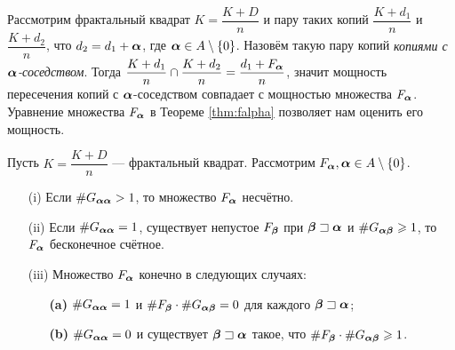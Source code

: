 Рассмотрим фрактальный квадрат $K=\dfrac{K+D}{n}$ и пару таких копий $\dfrac{K+d_1}{n}$ и $\dfrac{K+d_2}{n}$, что $d_2=d_1+{\bm{\alpha}}$, где ${\bm{\alpha}}\in A\setminus\{0\}$.
Назовём такую пару копий {\em копиями с ${\bm{\alpha}}$-соседством}.
Тогда $\dfrac{K+d_1}{n}\cap\dfrac{K+d_2}{n}=\dfrac{d_1+F_{\bm{\alpha}}}{n}$, значит мощность пересечения копий с ${\bm{\alpha}}$-соседством совпадает с мощностью множества $F_{\bm{\alpha}}$.
Уравнение множества $F_{\bm{\alpha}}$ в Теореме \ref{thm:falpha} позволяет нам оценить его мощность.

\begin{theorem}\label{fin_int}
Пусть $K=\dfrac{K+D}{n}$ --- фрактальный квадрат. Рассмотрим $F_{\bm{\alpha}}, {\bm{\alpha}}\in A\setminus\{0\}$.
\begin{itemize}[nolistsep]
 \item[(i)] Если $\#G_{{\bm{\alpha}}{\bm{\alpha}}}> 1$, то множество $F_{\bm{\alpha}}$ несчётно.
 \item[(ii)] Если $\#G_{{\bm{\alpha}}{\bm{\alpha}}}=1$, существует непустое $F_{\bm{\beta}}$ при ${\bm{\beta}}\sqsupset{\bm{\alpha}}$ и $\#G_{{\bm{\alpha}}{\bm{\beta}}}\geqslant1$, то $F_{\bm{\alpha}}$ бесконечное счётное.
 \item[(iii)] Множество $F_{\bm{\alpha}}$ конечно в следующих случаях:
 \begin{itemize}[nolistsep]
 \item[\textbf{(a)}] $\#G_{{\bm{\alpha}}{\bm{\alpha}}}=1$ и $\#F_{\bm{\beta}}\cdot\#G_{{\bm{\alpha}}{\bm{\beta}}}=0$ для каждого ${\bm{\beta}}\sqsupset{\bm{\alpha}}$;
 \item[\textbf{(b)}] $\#G_{{\bm{\alpha}}{\bm{\alpha}}}=0$ и существует ${\bm{\beta}}\sqsupset{\bm{\alpha}}$ такое, что $\#F_{\bm{\beta}}\cdot\#G_{{\bm{\alpha}}{\bm{\beta}}}\geqslant1$.
 \end{itemize}
\end{itemize} 
\end{theorem}

